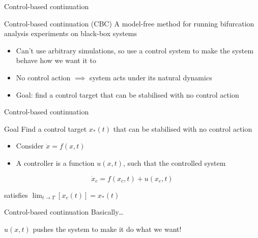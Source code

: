 \documentclass[presentation]{beamer}
\begin{document}
\begin{frame}[label={sec:org8c3f973}]{Control-based continuation}
\begin{block}{Control-based continuation (CBC)}
    A model-free method for running bifurcation analysis experiments on black-box systems
\end{block}

\begin{itemize}[<+->]
\item Can't use arbitrary simulations, so use a control system to make the system behave how we want it to
\item No control action \(\implies\) system acts under its natural dynamics
\item Goal: find a control target that can be stabilised with no control action
\end{itemize}
\end{frame}

\begin{frame}[label={sec:orgd21691a}]{Control-based continuation}
\begin{block}{Goal}
    Find a control target \(x_*(t)\) that can be stabilised with no control action
\end{block}

\begin{itemize}
\item Consider \(\dot{x} = f(x,t)\)
\item A controller is a function \(u(x,t)\), such that the controlled system
\end{itemize}

\begin{equation}
\dot{x}_c = f(x_c,t) + u(x_c,t)
\end{equation}

satisfies \(\lim_{t\to T}\left[x_c(t)\right] = x_*(t)\)
\end{frame}

\begin{frame}[label={sec:orge661cdc}]{Control-based continuation}
Basically\ldots{}

\(u(x,t)\) pushes the system to make it do what we want!
\end{frame}
\end{document}
